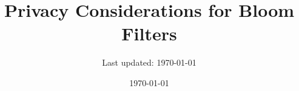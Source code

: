 %




\title{Privacy Considerations for Bloom Filters}
\date{\today}
\author{Last updated: \today}

\maketitle



\begin{abstract}
\centering
%
\end{abstract}




%

%
%


